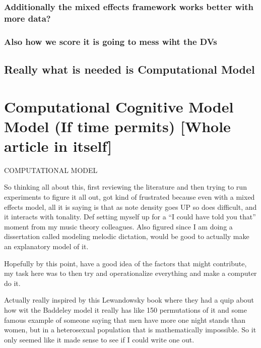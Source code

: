 \documentclass[]{book}
\theoremstyle{definition}
\theoremstyle{definition}
\theoremstyle{definition}
\theoremstyle{remark}
\begin{document}
\hypertarget{additionally-the-mixed-effects-framework-works-better-with-more-data}{%
\subsubsection{Additionally the mixed effects framework works better
with more
data?}\label{additionally-the-mixed-effects-framework-works-better-with-more-data}}

\hypertarget{also-how-we-score-it-is-going-to-mess-wiht-the-dvs}{%
\subsubsection{Also how we score it is going to mess wiht the
DVs}\label{also-how-we-score-it-is-going-to-mess-wiht-the-dvs}}

\hypertarget{really-what-is-needed-is-computational-model}{%
\subsection{Really what is needed is Computational
Model}\label{really-what-is-needed-is-computational-model}}

\hypertarget{computational-cognitive-model-model-if-time-permits-whole-article-in-itself}{%
\section{Computational Cognitive Model Model (If time permits) {[}Whole
article in
itself{]}}\label{computational-cognitive-model-model-if-time-permits-whole-article-in-itself}}

COMPUTATIONAL MODEL

So thinking all about this, first reviewing the literature and then
trying to run experiments to figure it all out, got kind of frustrated
because even with a mixed effects model, all it is saying is that as
note density goes UP so does difficult, and it interacts with tonality.
Def setting myself up for a ``I could have told you that'' moment from
my music theory colleagues. Also figured since I am doing a dissertation
called modeling melodic dictation, would be good to actually make an
explanatory model of it.

Hopefully by this point, have a good idea of the factors that might
contribute, my task here was to then try and operationalize everything
and make a computer do it.

Actually really inspired by this Lewandowsky book where they had a quip
about how wit the Baddeley model it really has like 150 permutations of
it and some famous example of someone saying that men have more one
night stands than women, but in a heterosexual population that is
mathematically impossible. So it only seemed like it made sense to see
if I could write one out.
\end{document}

